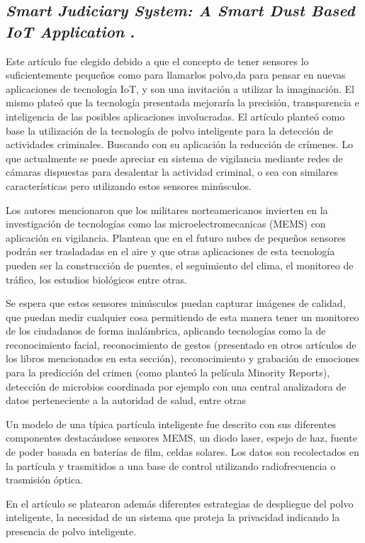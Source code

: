 \subsection{
    \textbf{\emph{Smart Judiciary System: A Smart Dust
            Based IoT Application}
    }
    \cite[pág. 128]{somani_emerging_2019}.
}

Este artículo fue elegido debido a que el concepto de tener sensores lo suficientemente pequeños como para llamarlos polvo,da para pensar en nuevas aplicaciones de tecnología IoT, y son una invitación a utilizar la imaginación.
El mismo plateó que la tecnología presentada mejoraría la precisión, transparencia e inteligencia de las posibles aplicaciones involucradas.
El artículo planteó como base la utilización de la tecnología de polvo inteligente para la detección de actividades criminales.
Buscando con su aplicación la reducción de crímenes. Lo que actualmente se puede apreciar en sistema de vigilancia mediante redes de cámaras dispuestas
para desalentar la actividad criminal, o sea con similares características pero utilizando estos sensores minúsculos.\par

Los autores mencionaron que los militares norteamericanos invierten en la investigación de tecnologías como las microelectromecanicas (MEMS) con aplicación en vigilancia. Plantean que en el futuro nubes de pequeños sensores podrán ser trasladadas en el aire y que otras aplicaciones de esta tecnología pueden ser la construcción de puentes, el seguimiento del clima, el monitoreo de tráfico, los estudios biológicos entre otras.\par

Se espera que estos sensores minúsculos puedan capturar imágenes de calidad, que puedan medir cualquier cosa permitiendo de esta manera tener un monitoreo de los ciudadanos de forma inalámbrica, aplicando tecnologías como la de reconocimiento facial, reconocimiento de gestos (presentado en otros artículos de los libros mencionados en esta sección), reconocimiento y grabación de emociones para la predicción del crimen (como planteó la película Minority Reports), detección de microbios coordinada por ejemplo con una central analizadora de datos perteneciente a la autoridad de salud, entre otras\par

Un modelo de una típica partícula inteligente fue descrito con sus diferentes componentes destacándose sensores MEMS, un diodo laser, espejo de haz, fuente de poder basada en baterías de film, celdas solares. Los datos son recolectados en  la partícula y trasmitidos a una base de control utilizando radiofrecuencia o trasmisión óptica.\par

En el artículo se platearon además diferentes estrategias de despliegue del polvo inteligente, la necesidad de un sistema que proteja la privacidad indicando la presencia de polvo inteligente.\par

